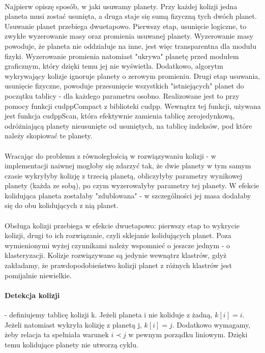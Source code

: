 \paragraph{} Najpierw opiszę sposób, w jaki usuwamy planety. Przy każdej kolizji jedna planeta musi zostać usunięta, a druga staje się sumą fizyczną tych dwóch planet. Usuwanie planet przebiega dwuetapowo. Pierwszy etap, usunięcie logiczne, to zwykłe wyzerowanie masy oraz promienia usuwanej planety. Wyzerowanie masy powoduje, że planeta nie oddziałuje na inne, jest więc transparentna dla modułu fizyki. Wyzerowanie promienia natomiast "ukrywa" planetę przed modułem graficznym, który dzięki temu jej nie wyświetla. Dodatkowo, algorytm wykrywający kolizje ignoruje planety o zerowym promieniu.
Drugi etap usuwania, usunięcie fizyczne, powoduje przesunięcie wszystkich "istniejących" planet do początku tablicy - dla każdego parametru osobno. Realizowane jest to przy pomocy funkcji cudppCompact z biblioteki cudpp.
Wewnątrz tej funkcji, używana jest funkcja cudppScan, która efektywnie zamienia tablicę zerojedynkową, odróżniającą planety nieusunięte od usuniętych, na tablicę indeksów, pod które należy skopiować te planety.

\paragraph{} Wracając do problemu z równoległością w rozwiązywaniu kolizji - w implementacji naiwnej mogłoby się zdarzyć tak, że dwie planety w tym samym czasie wykryłyby kolizję z trzecią planetą, obliczyłyby parametry wynikowej planety (każda ze sobą), po czym wyzerowałyby parametry tej planety. W efekcie kolidująca planeta zostałaby "zdublowana" - w szczególności jej masa dodałaby się do obu kolidujących z nią planet.

\paragraph{} Obsługa kolizji przebiega w efekcie dwuetapowo: pierwszy etap to wykrycie kolizji, drugi to ich rozwiązanie, czyli sklejanie kolidujących planet. Poza wymienionymi wyżej czynnikami należy wspomnieć o jeszcze jednym - o klasteryzacji. Kolizje rozwiązywane są jedynie wewnątrz klastrów, gdyż zakładamy, że prawdopodobieństwo kolizji planet z różnych klastrów jest pomijalnie niewielkie.

\paragraph{Detekcja kolizji} - definiujemy tablicę kolizji k. Jeżeli planeta i nie koliduje z żadną, \ensuremath{k[i] = i}. Jeżeli natomiast wykryła kolizję z planetą j, \ensuremath{k[i] = j}. Dodatkowo wymagamy, żeby relacja ta spełniała warunek \ensuremath{i\prec j} w pewnym porządku liniowym. Dzięki temu kolidujące planety nie utworzą cyklu.

